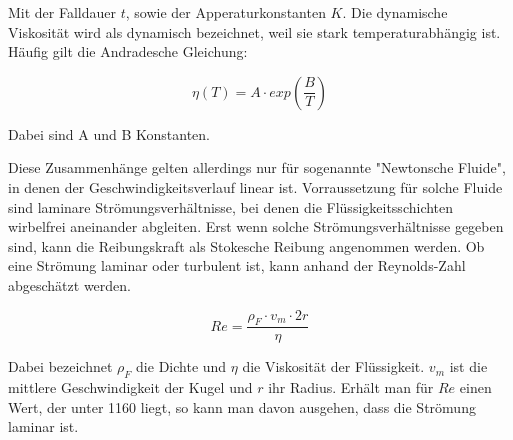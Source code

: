 Mit der Falldauer $t$, sowie der Apperaturkonstanten $K$.
Die dynamische Viskosität wird als dynamisch bezeichnet, weil sie stark 
temperaturabhängig ist. Häufig gilt die Andradesche Gleichung:

\begin{equation}
\eta (T) = A\cdot exp(\frac{B}{T})
\end{equation}

Dabei sind A und B Konstanten. 

Diese Zusammenhänge gelten allerdings nur für sogenannte "Newtonsche Fluide",
in denen der Geschwindigkeitsverlauf linear ist. Vorraussetzung für solche 
Fluide sind laminare Strömungsverhältnisse, bei denen die Flüssigkeitsschichten
wirbelfrei aneinander abgleiten. Erst wenn solche Strömungsverhältnisse gegeben 
sind, kann die Reibungskraft als Stokesche Reibung angenommen werden. 
Ob eine Strömung laminar oder turbulent ist, kann anhand der Reynolds-Zahl 
abgeschätzt werden. 

\begin{equation}
Re = \frac{\rho _F\cdot v_m\cdot 2r}{\eta}
\label{eqn:Reynolds}
\end{equation}

Dabei bezeichnet $\rho _F$ die Dichte und $\eta$ die Viskosität der Flüssigkeit. 
$v_m$ ist die mittlere Geschwindigkeit der Kugel und $r$ ihr Radius.
Erhält man für $Re$ einen Wert, der unter 1160 liegt, so kann man davon ausgehen, 
dass die Strömung laminar ist. 

\cite{sample}
